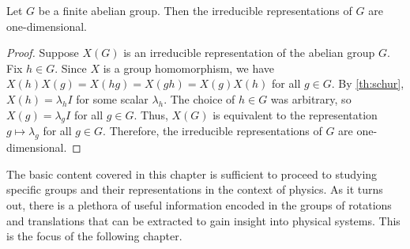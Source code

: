 
\begin{theorem}\label{cor:abelian_irred}
    Let $G$ be a finite abelian group. Then the irreducible representations of $G$ are one-dimensional.
\end{theorem}
\begin{proof}
    Suppose $X(G)$ is an irreducible representation of the abelian group $G$. Fix $h\in G$. Since $X$ is a group homomorphism, we have $X(h)X(g)=X(hg)=X(gh)=X(g)X(h)$ for all $g\in G$. By \cref{th:schur}, $X(h) = \lambda_h I$ for some scalar $\lambda_h$. The choice of $h\in G$ was arbitrary, so $X(g) = \lambda_g I$ for all $g\in G$. Thus, $X(G)$ is equivalent to the representation $g\mapsto \lambda_g$ for all $g\in G$. Therefore, the irreducible representations of $G$ are one-dimensional.
\end{proof}
The basic content covered in this chapter is sufficient to proceed to studying specific groups and their representations in the context of physics. As it turns out, there is a plethora of useful information encoded in the groups of rotations and translations that can be extracted to gain insight into physical systems. This is the focus of the following chapter.
